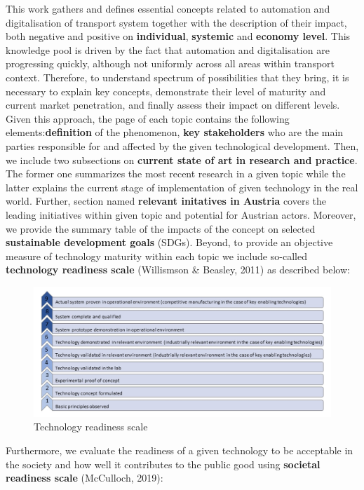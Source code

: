 \documentclass[
]{book}
\begin{document}
This work gathers and defines essential concepts related to automation and digitalisation of transport system together with the description of their impact, both negative and positive on \textbf{individual}, \textbf{systemic} and \textbf{economy level}. This knowledge pool is driven by the fact that automation and digitalisation are progressing quickly, although not uniformly across all areas within transport context. Therefore, to understand spectrum of possibilities that they bring, it is necessary to explain key concepts, demonstrate their level of maturity and current market penetration, and finally assess their impact on different levels. Given this approach, the page of each topic contains the following elements:\textbf{definition} of the phenomenon,
\textbf{key stakeholders} who are the main parties responsible for and affected by the given technological development. Then, we include two subsections on \textbf{current state of art in research and practice}. The former one summarizes the most recent research in a given topic while the latter explains the current stage of implementation of given technology in the real world. Further, section named \textbf{relevant initatives in Austria} covers the leading initiatives within given topic and potential for Austrian actors. Moreover, we provide the summary table of the impacts of the concept on selected \textbf{sustainable development goals} (SDGs). Beyond, to provide an objective measure of technology maturity within each topic we include so-called \textbf{technology readiness scale} (Willismson \& Beasley, 2011) as described below:

\begin{figure}
\includegraphics[width=0.9\linewidth]{image/TRL_cropped} \caption{Technology readiness scale}\label{fig:unnamed-chunk-2}
\end{figure}

Furthermore, we evaluate the readiness of a given technology to be acceptable in the society and how well it contributes to the public good using \textbf{societal readiness scale} (McCulloch, 2019):
\end{document}
